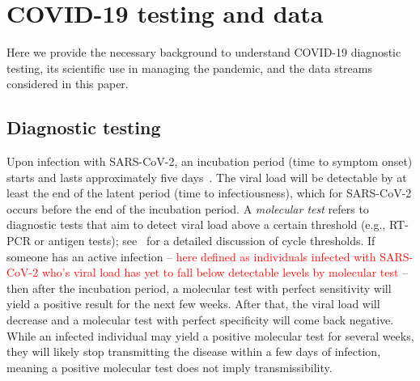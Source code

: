 \documentclass[11pt]{amsart}
\numberwithin{equation}{section}
\theoremstyle{plain}
\begin{document}



 \section{COVID-19 testing and data}
 \label{section:data}

Here we provide the necessary background to understand COVID-19 diagnostic testing, its scientific use in managing the pandemic, and the data streams considered in this paper.

\subsection{Diagnostic testing}
\label{section:testinginfo}

 Upon infection with SARS-CoV-2, an incubation period (time to symptom onset) starts and lasts approximately five days~\citep{Lauer2020}.  The viral load will be detectable by at least the end of the latent period (time to infectiousness), which for SARS-CoV-2 occurs before the end of the incubation period.  A \emph{molecular test} refers to diagnostic tests that aim to detect viral load above a certain threshold (e.g., RT-PCR or antigen tests); see~\cite{Mina2020} for a detailed discussion of cycle thresholds. If someone has an active infection -- \textcolor{red}{here defined as individuals infected with SARS-CoV-2 who's viral load has yet to fall below detectable levels by molecular test} -- then after the incubation period, a molecular test with perfect sensitivity will yield a positive result for the next few weeks.  After that, the viral load will decrease and a molecular test with perfect specificity will come back negative. While an infected individual may yield a positive molecular test for several weeks, they will likely stop transmitting the disease within a few days of infection, meaning a positive molecular test does not imply transmissibility.
\end{document}
